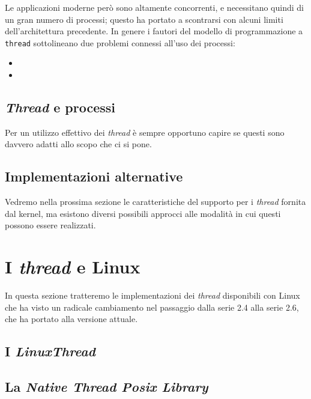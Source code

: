 Le applicazioni moderne però sono altamente concorrenti, e necessitano quindi
di un gran numero di processi; questo ha portato a scontrarsi con alcuni
limiti dell'architettura precedente. In genere i fautori del modello di
programmazione a \texttt{thread} sottolineano due problemi connessi all'uso
dei processi:
\begin{itemize}
\item
\item 
\end{itemize}



\subsection{\textit{Thread} e processi}
\label{sec:thread_process}

Per un utilizzo effettivo dei \textit{thread} è sempre opportuno capire se
questi sono davvero adatti allo scopo che ci si pone.


\subsection{Implementazioni alternative}
\label{sec:thread_other}

Vedremo nella prossima sezione le caratteristiche del supporto per i
\textit{thread} fornita dal kernel, ma esistono diversi possibili approcci
alle modalità in cui questi possono essere realizzati. 



\section{I \textit{thread} e Linux}
\label{sec:linux_thread}

In questa sezione tratteremo le implementazioni dei \textit{thread}
disponibili con Linux che ha visto un radicale cambiamento nel passaggio dalla
serie 2.4 alla serie 2.6, che ha portato alla versione attuale. 

\subsection{I \textit{LinuxThread}}
\label{sec:linux_old_thread}


\subsection{La \textit{Native Thread Posix Library}}
\label{sec:linux_ntpl}





